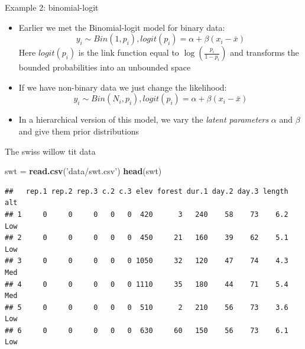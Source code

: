 \documentclass[ignorenonframetext,]{beamer}
\newenvironment{Shaded}{\begin{snugshade}}{\end{snugshade}}
\newcommand{\KeywordTok}[1]{\textcolor[rgb]{0.13,0.29,0.53}{\textbf{#1}}}
\newcommand{\StringTok}[1]{\textcolor[rgb]{0.31,0.60,0.02}{#1}}
\newcommand{\NormalTok}[1]{#1}
\begin{document}
\begin{frame}{Example 2: binomial-logit}

\begin{itemize}
\item
  Earlier we met the Binomial-logit model for binary data:
  \[y_i \sim Bin(1, p_i), logit(p_i) = \alpha + \beta (x_i - \bar{x})\]
  Here \(logit(p_i)\) is the link function equal to
  \(\log \left( \frac{p_i}{1-p_i} \right)\) and transforms the bounded
  probabilities into an unbounded space
\item
  If we have non-binary data we just change the likelihood:
  \[y_i \sim Bin(N_i, p_i), logit(p_i) = \alpha + \beta (x_i - \bar{x})\]
\item
  In a hierarchical version of this model, we vary the \emph{latent
  parameters} \(\alpha\) and \(\beta\) and give them prior distributions
\end{itemize}

\end{frame}

\begin{frame}[fragile]{The swiss willow tit data}

\tiny

\begin{Shaded}
\begin{Highlighting}[]
\NormalTok{swt =}\StringTok{ }\KeywordTok{read.csv}\NormalTok{(}\StringTok{'data/swt.csv'}\NormalTok{)}
\KeywordTok{head}\NormalTok{(swt)}
\end{Highlighting}
\end{Shaded}

\begin{verbatim}
##   rep.1 rep.2 rep.3 c.2 c.3 elev forest dur.1 day.2 day.3 length alt
## 1     0     0     0   0   0  420      3   240    58    73    6.2 Low
## 2     0     0     0   0   0  450     21   160    39    62    5.1 Low
## 3     0     0     0   0   0 1050     32   120    47    74    4.3 Med
## 4     0     0     0   0   0 1110     35   180    44    71    5.4 Med
## 5     0     0     0   0   0  510      2   210    56    73    3.6 Low
## 6     0     0     0   0   0  630     60   150    56    73    6.1 Low
\end{verbatim}

\end{frame}
\end{document}
